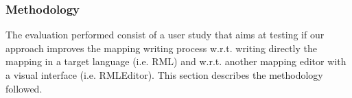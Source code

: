 
\subsubsection{Methodology}
\label{sec:chp5_mapeathor_eval_method}

The evaluation performed consist of a user study that aims at
testing if our approach improves the mapping writing process w.r.t. writing directly the mapping in a target language (i.e. RML) and w.r.t. another mapping editor with a visual interface (i.e. RMLEditor). This section describes the methodology followed.

